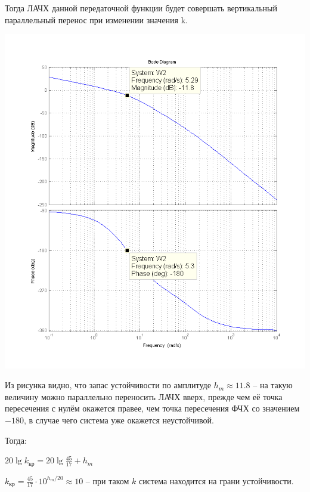 \documentclass[a4paper,12pt]{article}
\newcommand{\ds}{\displaystyle}
\renewcommand{\^}[2]{#1^{\, #2} \kern -1pt}
\newcommand{\1}{\kern 1pt}
\newcommand{\0}{\kern -1pt}
\begin{document}
	Тогда ЛАЧХ данной передаточной функции будет совершать вертикальный параллельный перенос при изменении значения k.
	\begin{center}
		\includegraphics[scale=0.6,page=1]{4_зад/nyquist_разомкнутой_исседование1}
	\end{center}
	Из рисунка видно, что запас устойчивости по амплитуде $h_m \approx 11.8$ -- на такую величину можно параллельно переносить ЛАЧХ вверх, прежде чем её точка пересечения с нулём окажется правее, чем точка пересечения ФЧХ со значением $-180$, в случае чего система уже окажется неустойчивой.
	
	Тогда:
	
	$\ds 20 \lg k_{\text{кр}} = 20 \lg \frac{45}{17} + h_m$
	
	$\ds k_{\text{кр}} = \frac{45}{17} \cdot 10^{h_m/20} \approx 10$ -- при таком $k$ система находится на грани устойчивости.
	
\end{document}
